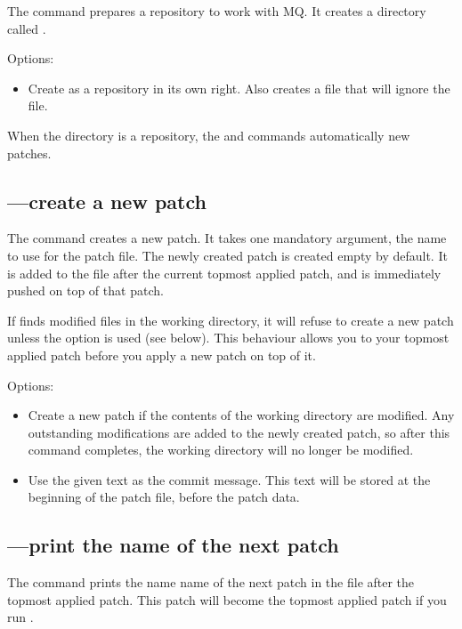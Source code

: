 The  command prepares a repository to work with MQ.  It
creates a directory called .

Options:
\begin{itemize}
\item[\hgopt{qinit}{-c}] Create  as a repository
  in its own right.  Also creates a  file that
  will ignore the  file.
\end{itemize}

When the  directory is a repository, the
 and  commands automatically 
new patches.

\subsection{---create a new patch}

The  command creates a new patch.  It takes one mandatory
argument, the name to use for the patch file.  The newly created patch
is created empty by default.  It is added to the 
file after the current topmost applied patch, and is immediately
pushed on top of that patch.

If  finds modified files in the working directory, it will
refuse to create a new patch unless the  option is
used (see below).  This behaviour allows you to  your
topmost applied patch before you apply a new patch on top of it.

Options:
\begin{itemize}
\item[\hgopt{qnew}{-f}] Create a new patch if the contents of the
  working directory are modified.  Any outstanding modifications are
  added to the newly created patch, so after this command completes,
  the working directory will no longer be modified.
\item[\hgopt{qnew}{-m}] Use the given text as the commit message.
  This text will be stored at the beginning of the patch file, before
  the patch data.
\end{itemize}

\subsection{---print the name of the next patch}

The  command prints the name name of the next patch in
the  file after the topmost applied patch.  This
patch will become the topmost applied patch if you run .

